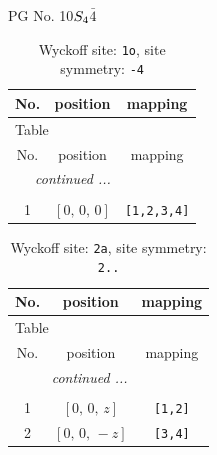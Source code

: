 \documentclass[fleqn,8pt]{jsarticle}
\begin{document}
\setcounter{MaxMatrixCols}{32}

\renewcommand{\tablename}{Table~}
\renewcommand{\figurename}{Figure~}
\begin{center}
\LARGE
PG No. 10\quad$S_{\rm 4}$\quad$\bar{4}$\quad[ tetragonal ]
\end{center}
\renewcommand{\arraystretch}{1.2}
\begin{longtable}{ccc}
\caption{Wyckoff site: {\tt 1o}, site symmetry: {\tt -4}}
 \\
 \hline \hline
No. & position & mapping \\ \hline \endfirsthead

\multicolumn{2}{l}{\tablename\ \thetable{}} \\
 \hline \hline
No. & position & mapping \\ \hline \endhead

 \hline \hline
\multicolumn{2}{r}{\footnotesize\it continued ...} \\ \endfoot

 \hline \hline
\multicolumn{2}{r}{} \\ \endlastfoot

1 & $\left[ 0,\, 0,\, 0 \right]$ & {\tt [1,2,3,4]} \\
\end{longtable}
\renewcommand{\arraystretch}{1.2}
\begin{longtable}{ccc}
\caption{Wyckoff site: {\tt 2a}, site symmetry: {\tt 2..}}
 \\
 \hline \hline
No. & position & mapping \\ \hline \endfirsthead

\multicolumn{2}{l}{\tablename\ \thetable{}} \\
 \hline \hline
No. & position & mapping \\ \hline \endhead

 \hline \hline
\multicolumn{2}{r}{\footnotesize\it continued ...} \\ \endfoot

 \hline \hline
\multicolumn{2}{r}{} \\ \endlastfoot

1 & $\left[ 0,\, 0,\, z \right]$ & {\tt [1,2]} \\ \hline
2 & $\left[ 0,\, 0,\, - z \right]$ & {\tt [3,4]} \\
\end{longtable}
\renewcommand{\arraystretch}{1.2}
\end{document}

